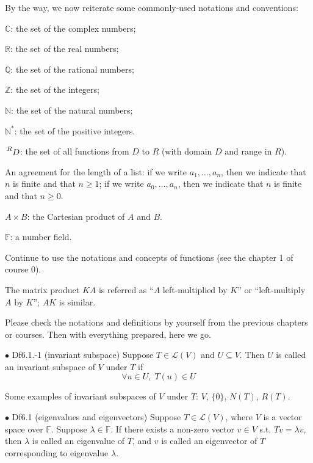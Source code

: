 \documentclass{article}
\begin{document}
By the way, we now reiterate some commonly-used notations and conventions:
\begin{compactenum}
    \item $\mathbb{C}$: the set of the complex numbers;
    \item $\mathbb{R}$: the set of the real numbers;
    \item $\mathbb{Q}$: the set of the rational numbers;
    \item $\mathbb{Z}$: the set of the integers;
    \item $\mathbb{N}$: the set of the natural numbers;
    \item $\mathbb{N^\ast}$: the set of the positive integers.
    \item $\sideset{^R}{}{\mathop{D}}$: the set of all functions from $D$ to $R$ (with domain $D$ and range in $R$).
    \item An agreement for the length of a list: if we write $a_1, \dots, a_n$, then we indicate that $n$ is finite and that $n\geq 1$; if we write $a_0, \dots, a_n$, then we indicate that $n$ is finite and that $n\geq 0$.
    \item $A\times B$: the Cartesian product of $A$ and $B$.
    \item $\mathbb{F}$: a number field.
    \item Continue to use the notations and concepts of functions (see the chapter 1 of course 0).
    \item The matrix product $KA$ is referred as ``$A$ left-multiplied by $K$'' or ``left-multiply $A$ by $K$''; $AK$ is similar.
\end{compactenum} 
Please check the notations and definitions by yourself from the previous chapters or courses. Then with everything prepared, here we go.

\begin{Df}{$\bullet$ Df6.1.-1 (invariant subspace)}
    Suppose $T\in\mathcal{L}(V)$ and $U\subseteq V$. Then $U$ is called an invariant subspace of $V$ under $T$ if
    $$\forall u\in U, \;T(u)\in U$$
\end{Df}

\begin{Rmk}{}
    Some examples of invariant subspaces of $V$ under $T$: $V$, $\{0\}$, $N(T)$, $R(T)$.
\end{Rmk}

\begin{Df}{$\bullet$ Df6.1 (eigenvalues and eigenvectors)}
    Suppose $T\in\mathcal{L}(V)$, where $V$ is a vector space over $\mathbb{F}$. Suppose $\lambda\in\mathbb{F}$. If there exists a non-zero vector $v\in V$ s.t. $Tv=\lambda v$, then $\lambda$ is called an eigenvalue of $T$, and $v$ is called an eigenvector of $T$ corresponding to eigenvalue $\lambda$.
\end{Df}
\end{document}
